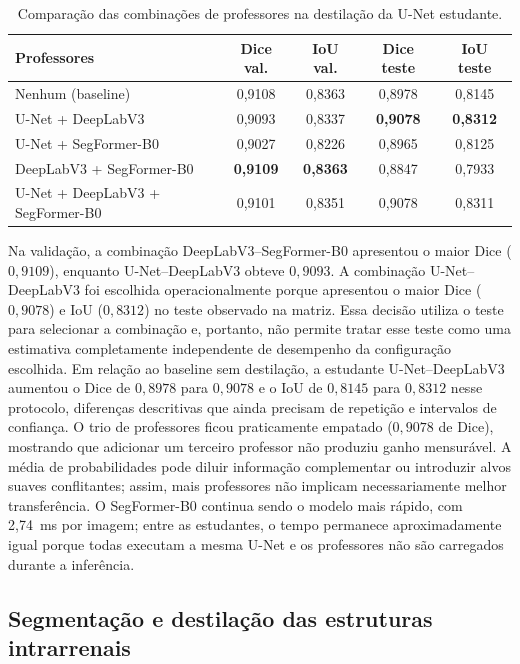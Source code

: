 \documentclass[12pt]{article}
\begin{document}
\begin{table}[!htbp]
\centering
\scriptsize
\caption[Combinações de professores na destilação]{Comparação das combinações de professores na destilação da U-Net estudante.}
\label{tab:matriz_destilacao}
\begin{tabular}{lcccc}
\toprule
\textbf{Professores} & \textbf{Dice val.} & \textbf{IoU val.} & \textbf{Dice teste} & \textbf{IoU teste} \\
\midrule
Nenhum (baseline) & 0,9108 & 0,8363 & 0,8978 & 0,8145 \\
U-Net + DeepLabV3 & 0,9093 & 0,8337 & \textbf{0,9078} & \textbf{0,8312} \\
U-Net + SegFormer-B0 & 0,9027 & 0,8226 & 0,8965 & 0,8125 \\
DeepLabV3 + SegFormer-B0 & \textbf{0,9109} & \textbf{0,8363} & 0,8847 & 0,7933 \\
U-Net + DeepLabV3 + SegFormer-B0 & 0,9101 & 0,8351 & 0,9078 & 0,8311 \\
\bottomrule
\end{tabular}
\end{table}

Na validação, a combinação DeepLabV3--SegFormer-B0 apresentou o maior Dice
($0{,}9109$), enquanto U-Net--DeepLabV3 obteve $0{,}9093$. A combinação
U-Net--DeepLabV3 foi escolhida operacionalmente porque apresentou o maior Dice
($0{,}9078$) e IoU ($0{,}8312$) no teste observado na matriz. Essa decisão
utiliza o teste para selecionar a combinação e, portanto, não permite tratar
esse teste como uma estimativa completamente independente de desempenho da
configuração escolhida. Em relação ao baseline sem destilação, a estudante
U-Net--DeepLabV3 aumentou o Dice de $0{,}8978$ para $0{,}9078$ e o IoU de
$0{,}8145$ para $0{,}8312$ nesse protocolo, diferenças descritivas que ainda
precisam de repetição e intervalos de confiança. O trio de professores ficou
praticamente empatado ($0{,}9078$ de Dice), mostrando que adicionar um terceiro
professor não produziu ganho mensurável. A média de probabilidades pode diluir
informação complementar ou introduzir alvos suaves conflitantes; assim, mais
professores não implicam necessariamente melhor transferência. O SegFormer-B0
continua sendo o modelo mais rápido, com 2,74~ms por imagem; entre as
estudantes, o tempo permanece aproximadamente igual porque todas executam a
mesma U-Net e os professores não são carregados durante a inferência.


\subsection{Segmentação e destilação das estruturas intrarrenais}
\end{document}
